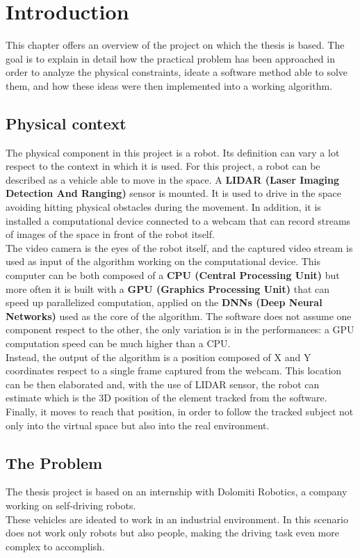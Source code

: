 \chapter{Introduction} \label{cha:introduction}
This chapter offers an overview of the project on which the thesis is based. The goal is to explain in detail how the practical problem has been approached in order to analyze the physical constraints, ideate a software method able to solve them, and how these ideas were then implemented into a working algorithm. 


\section{Physical context}
The physical component in this project is a robot. Its definition can vary a lot respect to the context in which it is used. For this project, a robot can be described as a vehicle able to move in the space. A \textbf{LIDAR (Laser Imaging Detection And Ranging)} sensor is mounted. It is used to drive in the space avoiding hitting physical obstacles during the movement. In addition, it is installed a computational device connected to a webcam that can record streams of images of the space in front of the robot itself.\\
The video camera is the eyes of the robot itself, and the captured video stream is used as input of the algorithm working on the computational device. This computer can be both composed of a \textbf{CPU (Central Processing Unit)} but more often it is built with a \textbf{GPU (Graphics Processing Unit)} that can speed up parallelized computation, applied on the \textbf{DNNs (Deep Neural Networks)} used as the core of the algorithm. The software does not assume one component respect to the other, the only variation is in the performances: a GPU computation speed can be much higher than a CPU.\\
Instead, the output of the algorithm is a position composed of X and Y coordinates respect to a single frame captured from the webcam. This location can be then elaborated and, with the use of LIDAR sensor, the robot can estimate which is the 3D position of the element tracked from the software.\\
Finally, it moves to reach that position, in order to follow the tracked subject not only into the virtual space but also into the real environment.


\section{The Problem}
The thesis project is based on an internship with Dolomiti Robotics\cite{dolomitiRobotics}, a company working on self-driving robots.\\
These vehicles are ideated to work in an industrial environment. In this scenario does not work only robots but also people, making the driving task even more complex to accomplish.


